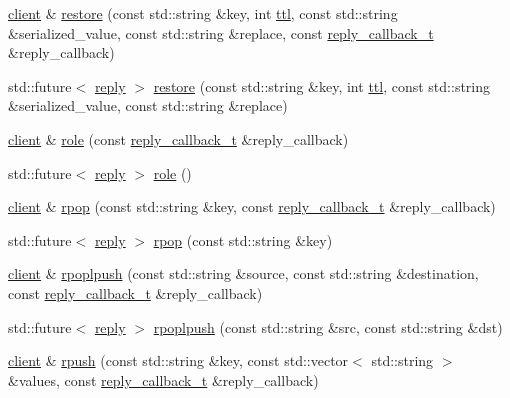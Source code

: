 \begin{DoxyCompactItemize}
\item 
\hyperlink{classcpp__redis_1_1client}{client} \& \hyperlink{classcpp__redis_1_1client_a5ebff3760403ee7d031083f185792780}{restore} (const std\+::string \&key, int \hyperlink{classcpp__redis_1_1client_a667bb7a6ead9c8cdaba534033a467367}{ttl}, const std\+::string \&serialized\+\_\+value, const std\+::string \&replace, const \hyperlink{classcpp__redis_1_1client_a061a1140d36d2eaeda82b09a0bb3f9f2}{reply\+\_\+callback\+\_\+t} \&reply\+\_\+callback)
\item 
std\+::future$<$ \hyperlink{classcpp__redis_1_1reply}{reply} $>$ \hyperlink{classcpp__redis_1_1client_a15b2c81c1d5b86f3490ecfb154b29ad1}{restore} (const std\+::string \&key, int \hyperlink{classcpp__redis_1_1client_a667bb7a6ead9c8cdaba534033a467367}{ttl}, const std\+::string \&serialized\+\_\+value, const std\+::string \&replace)
\item 
\hyperlink{classcpp__redis_1_1client}{client} \& \hyperlink{classcpp__redis_1_1client_a73bc7e0a747d437e5f9ac233a152c9bc}{role} (const \hyperlink{classcpp__redis_1_1client_a061a1140d36d2eaeda82b09a0bb3f9f2}{reply\+\_\+callback\+\_\+t} \&reply\+\_\+callback)
\item 
std\+::future$<$ \hyperlink{classcpp__redis_1_1reply}{reply} $>$ \hyperlink{classcpp__redis_1_1client_a34abe0819734b88704d89972b651e7ed}{role} ()
\item 
\hyperlink{classcpp__redis_1_1client}{client} \& \hyperlink{classcpp__redis_1_1client_aa29c7c00278934074e3cdbf70c0bb9cc}{rpop} (const std\+::string \&key, const \hyperlink{classcpp__redis_1_1client_a061a1140d36d2eaeda82b09a0bb3f9f2}{reply\+\_\+callback\+\_\+t} \&reply\+\_\+callback)
\item 
std\+::future$<$ \hyperlink{classcpp__redis_1_1reply}{reply} $>$ \hyperlink{classcpp__redis_1_1client_a7a2ea6e56ce9fa430cfc44ada77d960b}{rpop} (const std\+::string \&key)
\item 
\hyperlink{classcpp__redis_1_1client}{client} \& \hyperlink{classcpp__redis_1_1client_a1d50b5d26753768d79ebbe04f3615c7a}{rpoplpush} (const std\+::string \&source, const std\+::string \&destination, const \hyperlink{classcpp__redis_1_1client_a061a1140d36d2eaeda82b09a0bb3f9f2}{reply\+\_\+callback\+\_\+t} \&reply\+\_\+callback)
\item 
std\+::future$<$ \hyperlink{classcpp__redis_1_1reply}{reply} $>$ \hyperlink{classcpp__redis_1_1client_a4c4fd3342f665a4d902b42b051797e51}{rpoplpush} (const std\+::string \&src, const std\+::string \&dst)
\item 
\hyperlink{classcpp__redis_1_1client}{client} \& \hyperlink{classcpp__redis_1_1client_a925a0b8ae7864783d9e164776ca07075}{rpush} (const std\+::string \&key, const std\+::vector$<$ std\+::string $>$ \&values, const \hyperlink{classcpp__redis_1_1client_a061a1140d36d2eaeda82b09a0bb3f9f2}{reply\+\_\+callback\+\_\+t} \&reply\+\_\+callback)

\end{DoxyCompactItemize}
